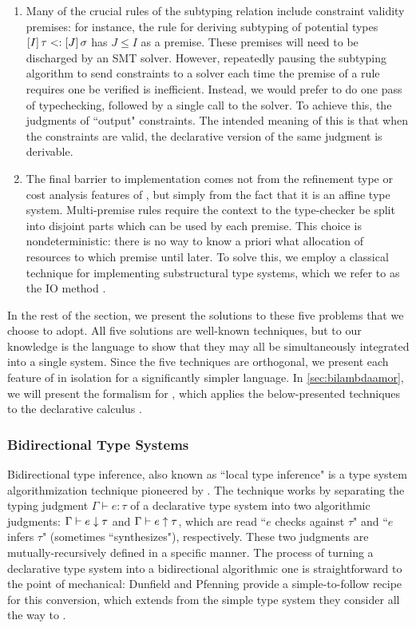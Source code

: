 \begin{enumerate}
  \item Many of the crucial rules of the \dlambdaamor subtyping relation include constraint validity premises: for instance, the rule for deriving subtyping of potential types $[I] \, \tau <: [J] \, \sigma$ has $J \leq I$ as a premise. These premises will need to be discharged by an SMT solver. However, repeatedly pausing the subtyping algorithm to send constraints to a solver each time the premise of a rule requires one be verified is inefficient. Instead, we would prefer to do one pass of typechecking, followed by a single call to the solver. To achieve this, the judgments of \bilambdaamor ``output" constraints. The intended meaning of this is that when the constraints are valid, the declarative version of the same judgment is derivable.
  
  \item The final barrier to implementation comes not from the refinement type or cost analysis features of \dlambdaamor, but simply from the fact that it is an affine type system. Multi-premise rules require the context to the type-checker be split into disjoint parts which can be used by each premise. This choice is nondeterministic: there is no way to know a priori what allocation of resources to which premise until later. To solve this, we employ a classical technique for implementing substructural type systems, which we refer to as the IO method \cite{cervesato:tcs00}.

\end{enumerate}

In the rest of the section, we present the solutions to these five problems that we choose to adopt. All five solutions are well-known techniques, but to our knowledge \bilambdaamor is the language to show that they may all be simultaneously integrated into a single system. Since the five techniques are orthogonal, we present each feature of \bilambdaamor in isolation for a significantly simpler language. In \autoref{sec:bilambdaamor}, we will present the formalism for \bilambdaamor, which applies the below-presented techniques to the declarative calculus \dlambdaamor.

\subsubsection{Bidirectional Type Systems}
\label{sec:bilambdaamor-overview-bidir}
Bidirectional type inference, also known as ``local type inference" is a type system algorithmization technique pioneered by \citet{pierce-and-turner:lti}. The technique works by separating the typing judgment $\Gamma \vdash e : \tau$ of a declarative type system into two algorithmic judgments: $\Gamma \vdash e \downarrow \tau$ and $\Gamma \vdash e \uparrow  \tau$, which are read ``$e$ checks against $\tau$" and ``$e$ infers $\tau$" (sometimes ``synthesizes"), respectively. These two judgments are mutually-recursively defined in a specific manner. The process of turning a declarative type system into a bidirectional algorithmic one is straightforward to the point of mechanical: Dunfield and Pfenning \cite{dunfield:popl04} provide a simple-to-follow recipe for this conversion, which extends from the simple type system they consider all the way to \dlambdaamor. 

